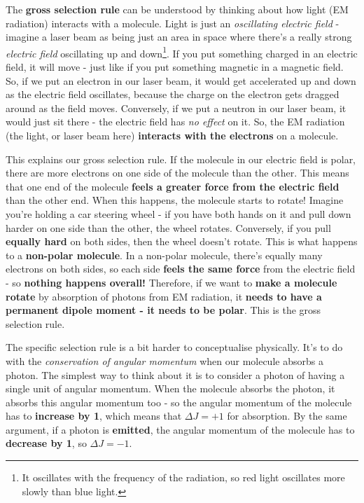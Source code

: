 \documentclass{memoir}[11pt,oneside,a4paper,openany]
\begin{document}
The \textbf{gross selection rule} can be understood by thinking about how light (EM radiation) interacts with a molecule. Light is just an \emph{oscillating electric field} - imagine a laser beam as being just an area in space where there's a really strong \emph{electric field} oscillating up and down\footnote{It oscillates with the frequency of the radiation, so red light oscillates more slowly than blue light.}. If you put something charged in an electric field, it will move - just like if you put something magnetic in a magnetic field. So, if we put an electron in our laser beam, it would get accelerated up and down as the electric field oscillates, because the charge on the electron gets dragged around as the field moves. Conversely, if we put a neutron in our laser beam, it would just sit there - the electric field has \emph{no effect} on it. So, the EM radiation (the light, or laser beam here) \textbf{interacts with the electrons} on a molecule. 

This explains our gross selection rule. If the molecule in our electric field is polar, there are more electrons on one side of the molecule than the other. This means that one end of the molecule \textbf{feels a greater force from the electric field} than the other end. When this happens, the molecule starts to rotate! Imagine you're holding a car steering wheel - if you have both hands on it and pull down harder on one side than the other, the wheel rotates. Conversely, if you pull \textbf{equally hard} on both sides, then the wheel doesn't rotate. This is what happens to a \textbf{non-polar molecule}. In a non-polar molecule, there's equally many electrons on both sides, so each side \textbf{feels the same force} from the electric field - so \textbf{nothing happens overall!} Therefore, if we want to \textbf{make a molecule rotate} by absorption of photons from EM radiation, it \textbf{needs to have a permanent dipole moment - it needs to be polar}. This is the gross selection rule.

The specific selection rule is a bit harder to conceptualise physically. It's to do with the \emph{conservation of angular momentum} when our molecule absorbs a photon. The simplest way to think about it is to consider a photon of having a single unit of angular momentum. When the molecule absorbs the photon, it absorbs this angular momentum too - so the angular momentum of the molecule has to \textbf{increase by 1}, which means that $\Delta J = +1$ for absorption. By the same argument, if a photon is \textbf{emitted}, the angular momentum of the molecule has to \textbf{decrease by 1}, so $\Delta J = -1$. 
\end{document}
